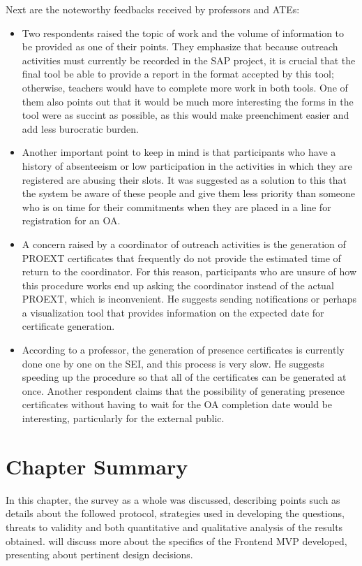 Next are the noteworthy feedbacks received by professors and \acp{ATE}:
\begin{itemize}
  \item Two respondents raised the topic of work and the volume of information to be provided as one of their points. They emphasize that because outreach activities must currently be recorded in the \ac{SAP} project, it is crucial that the final tool be able to provide a report in the format accepted by this tool; otherwise, teachers would have to complete more work in both tools. One of them also points out that it would be much more interesting the forms in the tool were as succint as possible, as this would make preenchiment easier and add less burocratic burden.
  \item Another important point to keep in mind is that participants who have a history of absenteeism or low participation in the activities in which they are registered are abusing their slots. It was suggested as a solution to this that the system be aware of these people and give them less priority than someone who is on time for their commitments when they are placed in a line for registration for an \ac{OA}.
  \item A concern raised by a coordinator of outreach activities is the generation of \ac{PROEXT} certificates that frequently do not provide the estimated time of return to the coordinator. For this reason, participants who are unsure of how this procedure works end up asking the coordinator instead of the actual \ac{PROEXT}, which is inconvenient. He suggests sending notifications or perhaps a visualization tool that provides information on the expected date for certificate generation.
  \item According to a professor, the generation of presence certificates is currently done one by one on the \ac{SEI}, and this process is very slow. He suggests speeding up the procedure so that all of the certificates can be generated at once. Another respondent claims that the possibility of generating presence certificates without having to wait for the \ac{OA} completion date would be interesting, particularly for the external public.
\end{itemize}

\section{Chapter Summary}\label{survey:chapter-summary}

In this chapter, the survey as a whole was discussed, describing points such as details about the followed protocol, strategies used in developing the questions, threats to validity and both quantitative and qualitative analysis of the results obtained.  will discuss more about the specifics of the Frontend \ac{MVP} developed, presenting about pertinent design decisions.